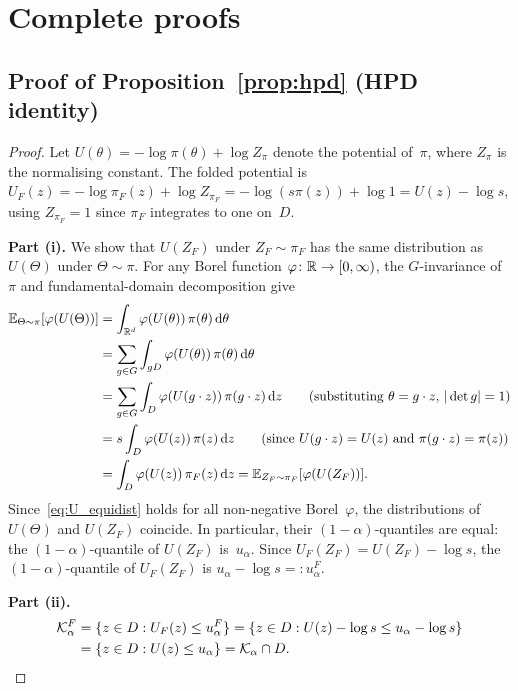 %  

\appendix
\renewcommand{\thesection}{\Alph{section}}

\section{Complete proofs}
\label{app:proofs}


\subsection{Proof of Proposition~\ref{prop:hpd} (HPD identity)}
\label{app:proof_hpd}

\begin{proof}
  Let $U(\theta) = -\log\pi(\theta) + \log Z_\pi$ denote the
  potential of~$\pi$, where $Z_\pi$ is the normalising constant.
  The folded potential is
  $U_F(z) = -\log\pi_F(z) + \log Z_{\pi_F}
  = -\log(s\pi(z)) + \log 1 = U(z) - \log s$,
  using $Z_{\pi_F} = 1$ since $\pi_F$ integrates to one on~$D$.

  \textbf{Part (i).}
  We show that $U(Z_F)$ under $Z_F \sim \pi_F$ has the same
  distribution as $U(\Theta)$ under $\Theta \sim \pi$.
  For any Borel function $\varphi\colon \mathbb{R} \to [0,\infty)$,
  the $G$-invariance of~$\pi$ and fundamental-domain decomposition
  give
  \begin{align}
    \mathbb{E}_{\Theta \sim \pi}[\varphi(U(\Theta))]
    &= \int_{\mathbb{R}^d} \varphi(U(\theta))\,\pi(\theta)\,\mathrm{d}\theta
    \notag \\
    &= \sum_{g \in G} \int_{gD}
       \varphi(U(\theta))\,\pi(\theta)\,\mathrm{d}\theta
    \notag \\
    &= \sum_{g \in G} \int_D
       \varphi(U(g \cdot z))\,\pi(g \cdot z)\,\mathrm{d}z
       \qquad\text{(substituting $\theta = g \cdot z$, $|\det g| = 1$)}
    \notag \\
    &= s \int_D \varphi(U(z))\,\pi(z)\,\mathrm{d}z
       \qquad\text{(since $U(g \cdot z) = U(z)$ and $\pi(g \cdot z) = \pi(z)$)}
    \notag \\
    &= \int_D \varphi(U(z))\,\pi_F(z)\,\mathrm{d}z
    = \mathbb{E}_{Z_F \sim \pi_F}[\varphi(U(Z_F))].
    \label{eq:U_equidist}
  \end{align}
  Since~\eqref{eq:U_equidist} holds for all non-negative
  Borel~$\varphi$, the distributions of $U(\Theta)$ and $U(Z_F)$
  coincide.  In particular, their $(1{-}\alpha)$-quantiles are
  equal: the $(1{-}\alpha)$-quantile of $U(Z_F)$ is~$u_\alpha$.
  Since $U_F(Z_F) = U(Z_F) - \log s$, the $(1{-}\alpha)$-quantile
  of $U_F(Z_F)$ is $u_\alpha - \log s =: u_\alpha^F$.

  \textbf{Part (ii).}
  \begin{align*}
    \mathcal{K}_\alpha^F
    &= \{z \in D : U_F(z) \leq u_\alpha^F\}
    = \{z \in D : U(z) - \log s \leq u_\alpha - \log s\} \\
    &= \{z \in D : U(z) \leq u_\alpha\}
    = \mathcal{K}_\alpha \cap D. \qedhere
  \end{align*}
\end{proof}


